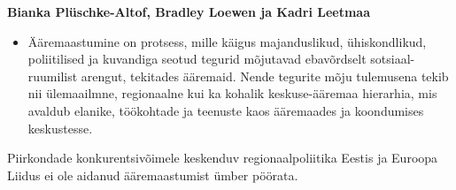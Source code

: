 \documentclass[estonian,]{article}
\providecommand{\tightlist}{%
  \setlength{\itemsep}{0pt}\setlength{\parskip}{0pt}}
\begin{document}
\begin{authors}
\textbf{Bianka Plüschke-Altof, Bradley Loewen ja Kadri Leetmaa}
\end{authors}

\begin{points}
\begin{itemize}
\tightlist
\item
  Ääremaastumine on protsess, mille käigus majanduslikud, ühiskondlikud,
  poliitilised ja kuvandiga seotud tegurid mõjutavad ebavõrdselt
  sotsiaal-ruumilist arengut, tekitades ääremaid. Nende tegurite mõju
  tulemusena tekib nii ülemaailmne, regionaalne kui ka kohalik
  keskuse-ääremaa hierarhia, mis avaldub elanike, töökohtade ja teenuste
  kaos ääremaades ja koondumises keskustesse.
\end{itemize}
\end{points}

\begin{blockquote-right}
Piirkondade konkurentsivõimele keskenduv regionaalpoliitika Eestis ja
Euroopa Liidus ei ole aidanud ääremaastumist ümber pöörata.
\end{blockquote-right}
\end{document}
